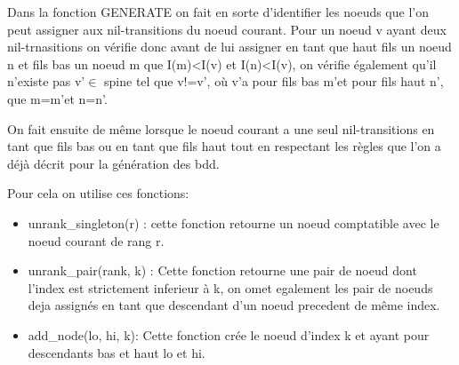 \documentclass[french]{article}
\begin{document}
\begin{algorithm}
  \begin{algorithmic}[1]
    \Statex
            \State {}
                \State {}
                \State {}
            \EndIf
            \Else
                \State {}
                \State {}
                        \EndIf
                    \Else
                        \State {}
                \EndIf
            \EndIf
            \State {}
            \State {}
  \end{algorithmic}
\end{algorithm}


Dans la fonction GENERATE on fait en sorte d'identifier les noeuds que l'on peut assigner aux nil-transitions du noeud courant. Pour un noeud v ayant deux nil-trnasitions on vérifie donc avant de lui assigner en tant que haut fils un noeud n et fils bas un noeud m que I(m)<I(v) et I(n)<I(v), on vérifie également qu'il n'existe pas v\textquoteright \(\in\) spine tel que v!=v\textquoteright, où v\textquoteright a pour fils bas m\textquoteright et pour fils haut n\textquoteright, que m=m\textquoteright et n=n\textquoteright.

On fait ensuite de même lorsque le noeud courant a une seul nil-transitions en tant que fils bas ou en tant que fils haut tout en respectant les règles que l'on a déjà décrit pour la génération des bdd. 

Pour cela on utilise ces fonctions:
\begin{itemize}
    \item unrank\_singleton(r) : cette fonction retourne un noeud comptatible avec le noeud courant de rang r.
    \item unrank\_pair(rank, k) : Cette fonction retourne une pair de noeud dont l'index est strictement inferieur à k, on omet egalement les pair de noeuds deja assignés en tant que descendant d'un noeud precedent de même index.
    
    \item add\_node(lo, hi, k): Cette fonction crée le noeud d'index k et ayant pour descendants bas et haut lo et hi.
\end{itemize}
\end{document}

